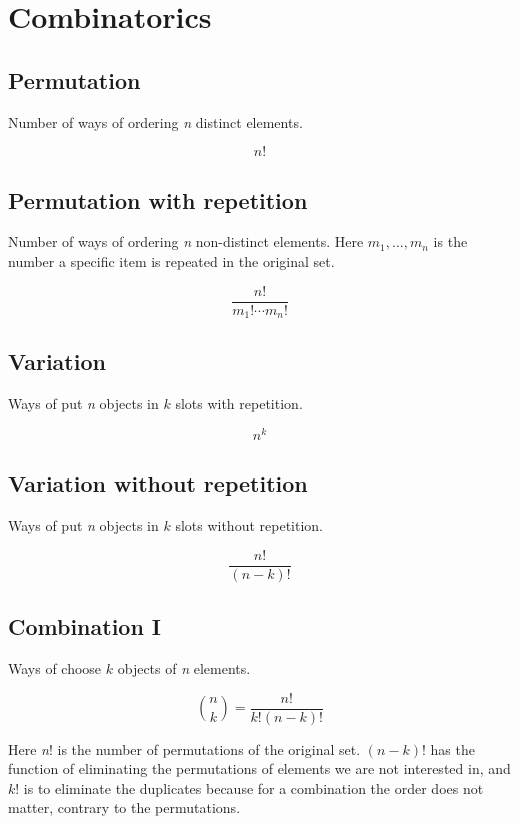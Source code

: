 \newpage
\section{Combinatorics}

\subsection{Permutation}

Number of ways of ordering \emph{n} distinct elements.

\[
    n!
\]

\subsection{Permutation with repetition}

Number of ways of ordering \emph{n} non-distinct elements. Here \(m_1, \dots, m_n\)
is the number a specific item is repeated in the original set.

\[
    \frac{n!}{m_1! \cdots m_n!}
\]

\subsection{Variation}

Ways of put \emph{n} objects in \(k\) slots with repetition.

\[
    n^k
\]

\subsection{Variation without repetition}

Ways of put \emph{n} objects in \(k\) slots without repetition.

\[
    \frac{n!}{(n -k)!}
\]

\subsection{Combination I}

Ways of choose \(k\) objects of \emph{n} elements.

\[
    \binom{n}{k} = \frac{n!}{k!(n-k)!}
\]

Here \emph{n}! is the number of permutations of the original set.
\((n-k)\)! has the function of eliminating the permutations of elements we are not interested in, and
\(k\)! is to eliminate the duplicates because for a combination the order does not matter, contrary to
the permutations.

